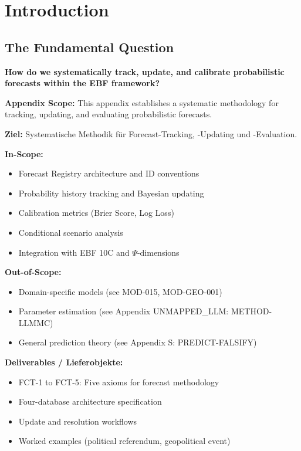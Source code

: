 \section{Introduction}
\label{sec:fct-intro}

\subsection{The Fundamental Question}

\begin{tcolorbox}[colback=yellow!10!white,colframe=yellow!50!black,title=Central Question]
\textbf{How do we systematically track, update, and calibrate probabilistic forecasts within the EBF framework?}
\end{tcolorbox}

\begin{tcolorbox}[colback=orange!5!white,colframe=orange!75!black,title=Appendix Scope]
\textbf{Appendix Scope:} This appendix establishes a systematic methodology for tracking, updating, and evaluating probabilistic forecasts.

\textbf{Ziel:} Systematische Methodik für Forecast-Tracking, -Updating und -Evaluation.

\textbf{In-Scope:}
\begin{itemize}
    \item Forecast Registry architecture and ID conventions
    \item Probability history tracking and Bayesian updating
    \item Calibration metrics (Brier Score, Log Loss)
    \item Conditional scenario analysis
    \item Integration with EBF 10C and $\Psi$-dimensions
\end{itemize}

\textbf{Out-of-Scope:}
\begin{itemize}
    \item Domain-specific models (see MOD-015, MOD-GEO-001)
    \item Parameter estimation (see Appendix UNMAPPED_LLM: METHOD-LLMMC)
    \item General prediction theory (see Appendix S: PREDICT-FALSIFY)
\end{itemize}

\textbf{Deliverables / Lieferobjekte:}
\begin{itemize}
    \item FCT-1 to FCT-5: Five axioms for forecast methodology
    \item Four-database architecture specification
    \item Update and resolution workflows
    \item Worked examples (political referendum, geopolitical event)
\end{itemize}
\end{tcolorbox}

